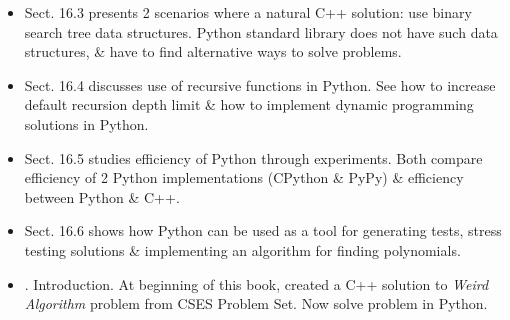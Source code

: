 \documentclass{article}
\begin{document}
\begin{itemize}
\begin{itemize}
		\item Sect. 16.3 presents 2 scenarios where a natural C++ solution: use binary search tree data structures. Python standard library does not have such data structures, \& have to find alternative ways to solve problems.
		\item Sect. 16.4 discusses use of recursive functions in Python. See how to increase default recursion depth limit \& how to implement dynamic programming solutions in Python.
		\item Sect. 16.5 studies efficiency of Python through experiments. Both compare efficiency of 2 Python implementations (CPython \& PyPy) \& efficiency between Python \& C++.
		\item Sect. 16.6 shows how Python can be used as a tool for generating tests, stress testing solutions \& implementing an algorithm for finding polynomials.
	\end{itemize}
	
	\begin{itemize}
		\item {. Introduction.} At beginning of this book, created a C++ solution to {\it Weird Algorithm} problem from CSES Problem Set. Now solve problem in Python.
		

\end{itemize}
\end{itemize}
\end{document}
